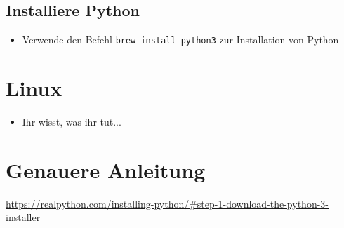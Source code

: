 \documentclass[accentcolor=3c,colorbacktitle,12pt]{tudaexercise}
\begin{document}
\subsection*{Installiere Python}
\begin{itemize}
	\item Verwende den Befehl \texttt{brew install python3} zur Installation von Python
\end{itemize}

\section*{Linux}
\begin{itemize}
	\item Ihr wisst, was ihr tut...
\end{itemize}

\section*{Genauere Anleitung}
 \url{https://realpython.com/installing-python/#step-1-download-the-python-3-installer}
\end{document}
